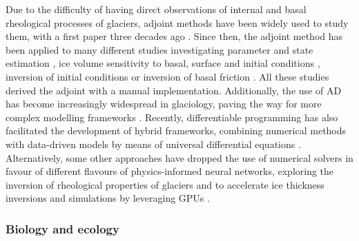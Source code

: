 Due to the difficulty of having direct observations of internal and basal rheological processes of glaciers, adjoint methods have been widely used to study them, with a first paper three decades ago \cite{macayeal1992basal}. 
Since then, the adjoint method has been applied to many different studies investigating parameter and state estimation \cite{goldberg2013parameter}, ice volume sensitivity to basal, surface and initial conditions \cite{heimbach2009greenland}, inversion of initial conditions \cite{mosbeux2016comparison} or inversion of basal friction \cite{morlighem2013inversion}.
All these studies derived the adjoint with a manual implementation. 
Additionally, the use of AD has become increasingly widespread in glaciology, paving the way for more complex modelling frameworks \cite{hascoet2018source, logan2020sicopolis}. 
Recently, differentiable programming has also facilitated the development of hybrid frameworks, combining numerical methods with data-driven models by means of universal differential equations \cite{BolibarSapienza_UDEs}. 
Alternatively, some other approaches have dropped the use of numerical solvers in favour of different flavours of physics-informed neural networks, exploring the inversion of rheological properties of glaciers \cite{wang2022discovering} and to accelerate ice thickness inversions and simulations by leveraging GPUs \cite{Jouvet_Cordonnier_Kim_Lüthi_Vieli_Aschwanden_2021, jouvet2023inversion}. 



\subsubsection{Biology and ecology}

